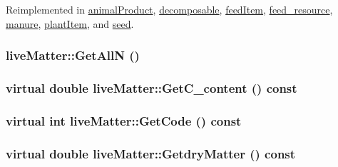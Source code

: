 Reimplemented in \hyperlink{classanimal_product_a46df4e113bcf6d492c31250569966806}{animalProduct}, \hyperlink{classdecomposable_ab15f1f4e93e58810887029648be0ec31}{decomposable}, \hyperlink{classfeed_item_a7e3003ebb344d52fea31448657666253}{feedItem}, \hyperlink{classfeed__resource_ab5b47b60feeca736e185b15a5125836a}{feed\_\-resource}, \hyperlink{classmanure_af2915d37963e5f4d3a4b0c0d91fab188}{manure}, \hyperlink{classplant_item_ae9aec44d433339eca078b4277801717a}{plantItem}, and \hyperlink{classseed_a0e2e68f7724e0551b885433a1e935ebf}{seed}.\hypertarget{classlive_matter_ac2063bf6ed8da618b7b2b2b47defaa12}{
\subsubsection[{GetAllN}]{ liveMatter::GetAllN ()}}
\label{classlive_matter_ac2063bf6ed8da618b7b2b2b47defaa12}
\hypertarget{classlive_matter_a899102ff3dccbfdc70b79e701c135514}{
\subsubsection[{GetC\_\-content}]{\setlength{\rightskip}{0pt plus 5cm}virtual double liveMatter::GetC\_\-content () const}}
\label{classlive_matter_a899102ff3dccbfdc70b79e701c135514}
\hypertarget{classlive_matter_afd7dcfed0138fc12d81d29aa586c5c73}{
\subsubsection[{GetCode}]{\setlength{\rightskip}{0pt plus 5cm}virtual int liveMatter::GetCode () const}}
\label{classlive_matter_afd7dcfed0138fc12d81d29aa586c5c73}
\hypertarget{classlive_matter_ad3d05f1e8ceedc99e214adca94638de0}{
\subsubsection[{GetdryMatter}]{\setlength{\rightskip}{0pt plus 5cm}virtual double liveMatter::GetdryMatter () const}}
